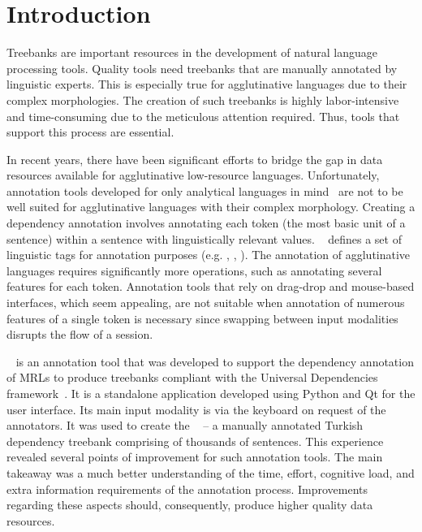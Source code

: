 \section{Introduction}
\label{sec:introduction}

Treebanks are important resources in the development of natural language processing tools.
Quality tools need treebanks that are manually annotated by linguistic experts.
This is especially true for agglutinative languages due to their complex morphologies.
The creation of such treebanks is highly labor-intensive and time-consuming due to the meticulous attention required.
Thus, tools that support this process are essential.

In recent years, there have been significant efforts to bridge the gap in data resources available for agglutinative low-resource languages.
Unfortunately, annotation tools developed for only analytical languages in mind~\cite{UD-tools} are not to be well suited for agglutinative languages with their complex morphology.
Creating a dependency annotation involves annotating each token (the most basic unit of a sentence) within a sentence with linguistically relevant values.
\conllu~\cite{UD} defines a set of linguistic tags for annotation purposes (e.g. \form, \lemma, \feats).
The annotation of agglutinative languages requires significantly more operations, such as annotating several features for each token.
Annotation tools that rely on drag-drop and mouse-based interfaces, which seem appealing, are not suitable when annotation of numerous features of a single token is necessary since swapping between input modalities disrupts the flow of a session.

\boatvone~\cite{turk2021resources} is an annotation tool that was developed to support the dependency annotation of MRLs to produce treebanks compliant with the Universal Dependencies framework~\cite{UD}.
It is a standalone application developed using Python and Qt for the user interface.
Its main input modality is via the keyboard on request of the annotators.
It was used to create the \bountreebank~\cite{turk-etal-2019-turkish,turk2021resources,UD-Boun-Treebank} -- a manually annotated Turkish dependency treebank comprising of thousands of sentences.
This experience revealed several points of improvement for such annotation tools.
The main takeaway was a much better understanding of the time, effort, cognitive load, and extra information requirements of the annotation process.
Improvements regarding these aspects should, consequently, produce higher quality data resources.

